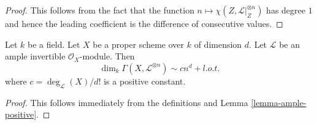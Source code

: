 \begin{proof}
This follows from the fact that the function
$n \mapsto \chi(Z, \mathcal{L}|_Z^{\otimes n})$ has degree $1$
and hence the leading coefficient is the difference of consecutive values.
\end{proof}

\begin{proposition}
\label{proposition-asymptotic-riemann-roch}
Let $k$ be a field. Let $X$ be a proper scheme over $k$ of dimension $d$.
Let $\mathcal{L}$ be an ample invertible $\mathcal{O}_X$-module.
Then
$$
\dim_k \Gamma(X, \mathcal{L}^{\otimes n}) \sim c n^d + l.o.t.
$$
where $c = \deg_\mathcal{L}(X)/d!$ is a positive constant.
\end{proposition}

\begin{proof}
This follows immediately from the definitions and
Lemma \ref{lemma-ample-positive}.
\end{proof}









